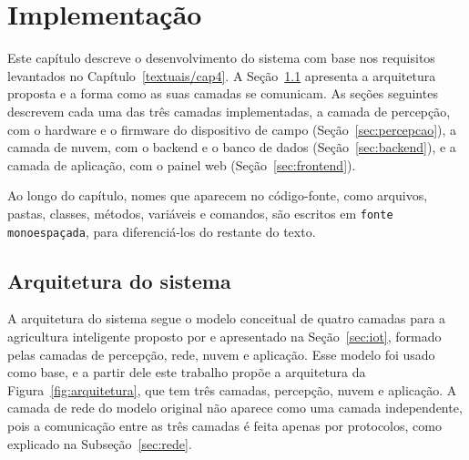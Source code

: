 \chapter{Implementação}
\label{textuais/cap5}

\providecommand{\preencher}[1]{\textcolor{red}{[#1]}}
\providecommand{\figuraprovisoria}[2]{\fbox{\parbox[c][#1][c]{0.9\textwidth}{\centering\textcolor{red}{#2}}}}

Este capítulo descreve o desenvolvimento do sistema com base nos requisitos levantados no Capítulo~\ref{textuais/cap4}. A Seção~\ref{sec:arquitetura} apresenta a arquitetura proposta e a forma como as suas camadas se comunicam. As seções seguintes descrevem cada uma das três camadas implementadas, a camada de percepção, com o hardware e o firmware do dispositivo de campo (Seção~\ref{sec:percepcao}), a camada de nuvem, com o backend e o banco de dados (Seção~\ref{sec:backend}), e a camada de aplicação, com o painel web (Seção~\ref{sec:frontend}).

Ao longo do capítulo, nomes que aparecem no código-fonte, como arquivos, pastas, classes, métodos, variáveis e comandos, são escritos em \texttt{fonte monoespaçada}, para diferenciá-los do restante do texto.

\section{Arquitetura do sistema}
\label{sec:arquitetura}

A arquitetura do sistema segue o modelo conceitual de quatro camadas para a agricultura inteligente proposto por  e apresentado na Seção~\ref{sec:iot}, formado pelas camadas de percepção, rede, nuvem e aplicação. Esse modelo foi usado como base, e a partir dele este trabalho propõe a arquitetura da Figura~\ref{fig:arquitetura}, que tem três camadas, percepção, nuvem e aplicação. A camada de rede do modelo original não aparece como uma camada independente, pois a comunicação entre as três camadas é feita apenas por protocolos, como explicado na Subseção~\ref{sec:rede}.

